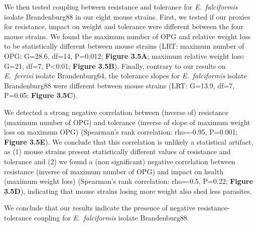 We then tested coupling between resistance and tolerance for \textit{E.~falciformis} isolate Brandenburg88 in our eight mouse strains. First, we tested if our proxies for resistance, impact on weight and tolerance were different between the four mouse strains. We found the maximum number of OPG and relative weight loss to be statistically different between mouse strains (LRT: maximum number of OPG: G=28.6, df=14, P=0.012; \textbf{Figure 3.5A}; maximum relative weight loss: G=21, df=7, P<0.01; \textbf{Figure 3.5B}). Finally, contrary to our results on \textit{E.~ferrisi} isolate Brandenburg64, the tolerance slopes for \textit{E.~falciformis} isolate Brandenburg88 were different between mouse strains (LRT: G=13.9, df=7, P=0.05; \textbf{Figure 3.5C}).\par

We detected a strong negative correlation between (inverse of) resistance (maximum number of OPG) and tolerance (inverse of slope of maximum weight loss on maximum OPG) (Spearman's rank correlation: rho=-0.95, P=0.001; \textbf{Figure 3.5E}). We conclude that this correlation is unlikely a statistical artifact, as (1) mouse strains present statistically different values of resistance and tolerance and (2) we found a (non significant) negative correlation between resistance (inverse of maximum number of OPG) and impact on health (maximum weight loss) (Spearman's rank correlation: rho=-0.5, P=0.22; \textbf{Figure 3.5D}), indicating that mouse strains losing more weight also shed less parasites. \par

We conclude that our results indicate the presence of negative resistance-tolerance coupling for \textit{E.~falciformis} isolate Brandenburg88.

